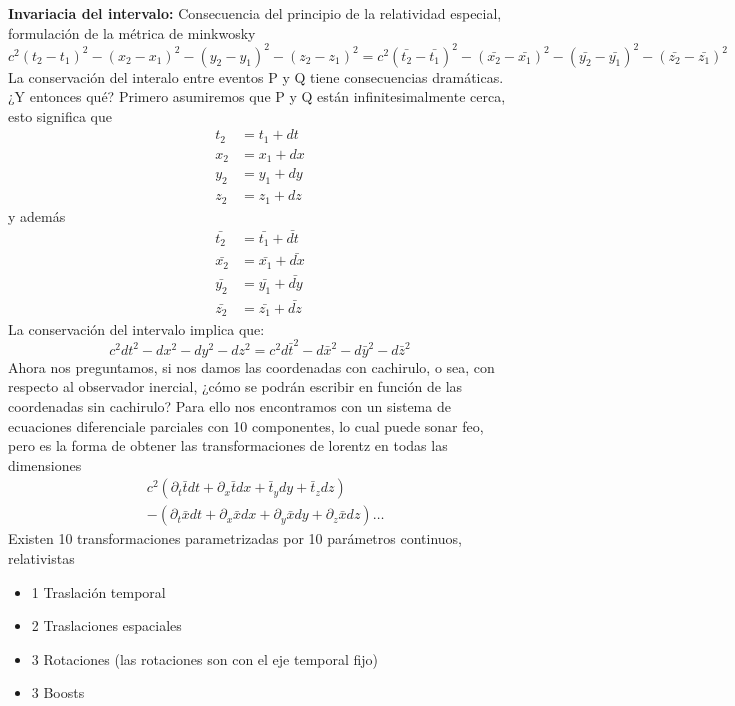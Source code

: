 \documentclass[../main.tex]{subfiles}
\begin{document}
\textbf{Invariacia del intervalo:} Consecuencia del principio de la relatividad especial, formulación de la métrica de minkwosky
\begin{equation}
    c^2(t_2-t_1)^2-(x_2-x_1)^2-(y_2-y_1)^2-(z_2-z_1)^2=c^2(\bar{t_2}-\bar{t_1})^2-(\bar{x_2}-\bar{x_1})^2-(\bar{y_2}-\bar{y_1})^2-(\bar{z_2}-\bar{z_1})^2
\end{equation}
La conservación del interalo entre eventos P y Q tiene consecuencias dramáticas. ¿Y entonces qué? Primero asumiremos que P y Q están infinitesimalmente cerca, esto significa que
\begin{align*}
    t_2 & =t_1+dt \\
    x_2 & = x_1 + dx \\
    y_2 & = y_1 + dy \\
    z_2 & = z_1 + dz
\end{align*}
y además
\begin{align*}
    \bar{t_2} & = \bar{t_1}+\bar{dt} \\
    \bar{x_2} & = \bar{x_1} + \bar{dx} \\
    \bar{y_2} & = \bar{y_1} + \bar{dy} \\
    \bar{z_2} & = \bar{z_1} + \bar{dz}
\end{align*}
La conservación del intervalo implica que:
\begin{equation}
    c^2dt^2-dx^2-dy^2-dz^2=c^2d\bar{t}^2-d\bar{x}^2-d\bar{y}^2-d\bar{z}^2
\end{equation}
Ahora nos preguntamos, si nos damos las coordenadas con cachirulo, o sea, con respecto al observador inercial, ¿cómo se podrán escribir en función de las coordenadas sin cachirulo?
Para ello nos encontramos con un sistema de ecuaciones diferenciale parciales con 10 componentes, lo cual puede sonar feo, pero es la forma de obtener las transformaciones de lorentz en todas las dimensiones
\begin{align*}
     & c^2\left( \partial_t \bar{t} dt + \partial_x\bar{t}dx + \bar{t}_y dy+ \bar{t}_z dz\right) \\
    & - \left(  \partial_t \bar{x}dt +\partial_x \bar{x}dx+\partial_y \bar{x}dy+\partial_z \bar{x}dz\right) \dots
\end{align*}
Existen 10 transformaciones parametrizadas por 10 parámetros continuos, relativistas
\begin{itemize}
    \item  1 Traslación temporal
    \item 2 Traslaciones espaciales
    \item 3 Rotaciones (las rotaciones son con el eje temporal fijo)
    \item 3 Boosts
\end{itemize}
\end{document}
